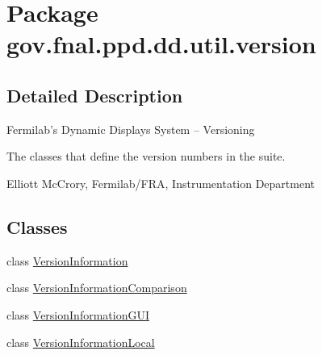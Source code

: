 \hypertarget{namespacegov_1_1fnal_1_1ppd_1_1dd_1_1util_1_1version}{\section{Package gov.\-fnal.\-ppd.\-dd.\-util.\-version}
\label{namespacegov_1_1fnal_1_1ppd_1_1dd_1_1util_1_1version}
}


\subsection{Detailed Description}
Fermilab's Dynamic Displays System -- Versioning 

The classes that define the version numbers in the suite. 

Elliott Mc\-Crory, Fermilab/\-F\-R\-A, Instrumentation Department \subsection*{Classes}
\begin{DoxyCompactItemize}
\item 
class \hyperlink{classgov_1_1fnal_1_1ppd_1_1dd_1_1util_1_1version_1_1VersionInformation}{Version\-Information}
\item 
class \hyperlink{classgov_1_1fnal_1_1ppd_1_1dd_1_1util_1_1version_1_1VersionInformationComparison}{Version\-Information\-Comparison}
\item 
class \hyperlink{classgov_1_1fnal_1_1ppd_1_1dd_1_1util_1_1version_1_1VersionInformationGUI}{Version\-Information\-G\-U\-I}
\item 
class \hyperlink{classgov_1_1fnal_1_1ppd_1_1dd_1_1util_1_1version_1_1VersionInformationLocal}{Version\-Information\-Local}
\end{DoxyCompactItemize}
